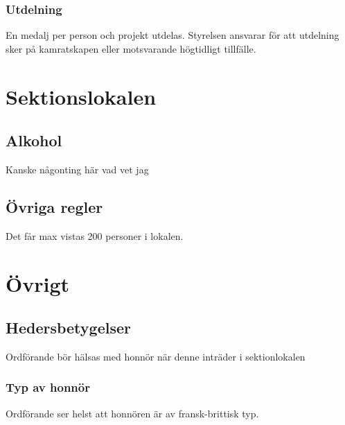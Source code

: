 \documentclass{../resources/dgovdoc}
\begin{document}
\subsubsection{Utdelning}

En medalj per person och projekt utdelas. Styrelsen ansvarar för att utdelning sker på kamratskapen eller motsvarande högtidligt tillfälle.

\section{Sektionslokalen}

\subsection{Alkohol}
Kanske någonting här vad vet jag

\subsection{Övriga regler}

Det får max vistas 200 personer i lokalen. 

\section{Övrigt}

\subsection{Hedersbetygelser}

Ordförande bör hälsas med honnör när denne inträder i sektionlokalen

\subsubsection{Typ av honnör}

Ordförande ser helst att honnören är av fransk-brittisk typ.
\end{document}
